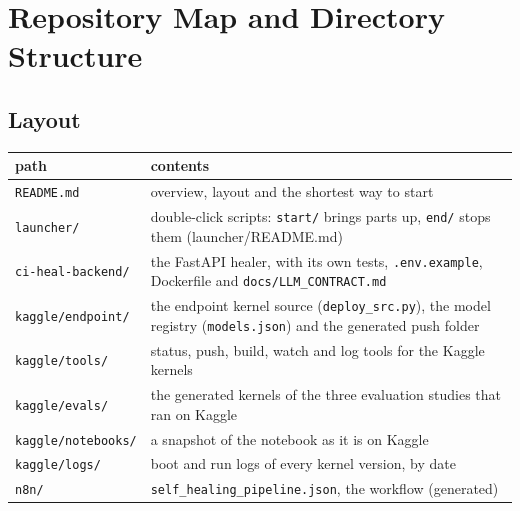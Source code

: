 
\chapter{Repository Map and Directory Structure}

\section{Layout}

\begingroup\small
\begin{longtable}{>{\raggedright\arraybackslash}p{0.376\dimexpr\linewidth-4\tabcolsep\relax}>{\raggedright\arraybackslash}p{0.624\dimexpr\linewidth-4\tabcolsep\relax}}
\toprule
\rowcolor{gray!14}\textbf{path} & \textbf{contents} \\
\midrule
\endhead
\bottomrule
\endfoot
\endlastfoot
\texttt{README.\allowbreak{}md} & overview, layout and the shortest way to start \\
\texttt{launcher/\allowbreak{}} & double-click scripts: \texttt{start/\allowbreak{}} brings parts up, \texttt{end/\allowbreak{}} stops them (launcher/\allowbreak{}README.md) \\
\texttt{ci-\allowbreak{}heal-\allowbreak{}backend/\allowbreak{}} & the FastAPI healer, with its own tests, \texttt{.\allowbreak{}env.\allowbreak{}example}, Dockerfile and \texttt{docs/\allowbreak{}LLM\_\allowbreak{}CONTRACT.\allowbreak{}md} \\
\texttt{kaggle/\allowbreak{}endpoint/\allowbreak{}} & the endpoint kernel source (\texttt{deploy\_\allowbreak{}src.\allowbreak{}py}), the model registry (\texttt{models.\allowbreak{}json}) and the generated push folder \\
\texttt{kaggle/\allowbreak{}tools/\allowbreak{}} & status, push, build, watch and log tools for the Kaggle kernels \\
\texttt{kaggle/\allowbreak{}evals/\allowbreak{}} & the generated kernels of the three evaluation studies that ran on Kaggle \\
\texttt{kaggle/\allowbreak{}notebooks/\allowbreak{}} & a snapshot of the notebook as it is on Kaggle \\
\texttt{kaggle/\allowbreak{}logs/\allowbreak{}} & boot and run logs of every kernel version, by date \\
\texttt{n8n/\allowbreak{}} & \texttt{self\_\allowbreak{}healing\_\allowbreak{}pipeline.\allowbreak{}json}, the workflow (generated) \\

\end{longtable}
